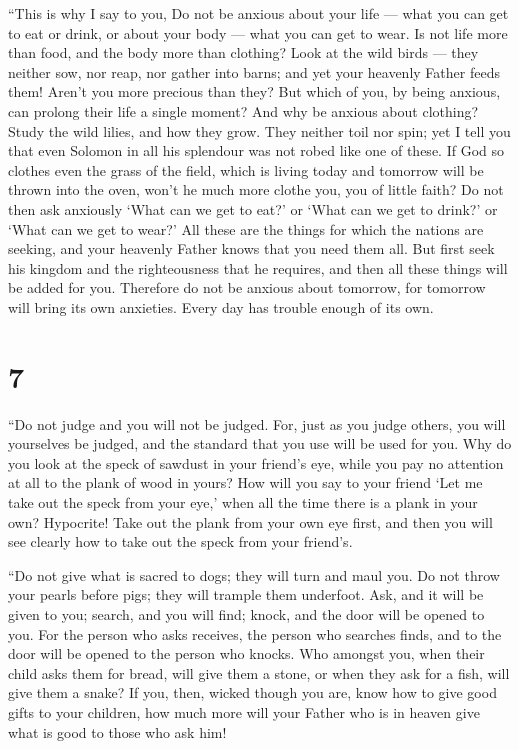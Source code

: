  ``This is why I say to you, Do not be anxious about your
life --- what you can get to eat or drink, or about your body --- what
you can get to wear. Is not life more than food, and the body more than
clothing?  Look at the wild birds --- they neither sow, nor
reap, nor gather into barns; and yet your heavenly Father feeds them!
Aren't you more precious than they?  But which of you, by
being anxious, can prolong their life a single moment?  And
why be anxious about clothing? Study the wild lilies, and how they grow.
They neither toil nor spin;  yet I tell you that even
Solomon in all his splendour was not robed like one of these.
 If God so clothes even the grass of the field, which is
living today and tomorrow will be thrown into the oven, won't he much
more clothe you, you of little faith?  Do not then ask
anxiously `What can we get to eat?' or `What can we get to drink?' or
`What can we get to wear?'  All these are the things for
which the nations are seeking, and your heavenly Father knows that you
need them all.  But first seek his kingdom and the
righteousness that he requires, and then all these things will be added
for you.  Therefore do not be anxious about tomorrow, for
tomorrow will bring its own anxieties. Every day has trouble enough of
its own.

\hypertarget{section-6}{%
\section{7}\label{section-6}}

 ``Do not judge and you will not be judged. 
For, just as you judge others, you will yourselves be judged, and the
standard that you use will be used for you.  Why do you look
at the speck of sawdust in your friend's eye, while you pay no attention
at all to the plank of wood in yours?  How will you say to
your friend `Let me take out the speck from your eye,' when all the time
there is a plank in your own?  Hypocrite! Take out the plank
from your own eye first, and then you will see clearly how to take out
the speck from your friend's.

 ``Do not give what is sacred to dogs; they will turn and
maul you. Do not throw your pearls before pigs; they will trample them
underfoot.  Ask, and it will be given to you; search, and
you will find; knock, and the door will be opened to you. 
For the person who asks receives, the person who searches finds, and to
the door will be opened to the person who knocks.  Who
amongst you, when their child asks them for bread, will give them a
stone,  or when they ask for a fish, will give them a
snake?  If you, then, wicked though you are, know how to
give good gifts to your children, how much more will your Father who is
in heaven give what is good to those who ask him!

